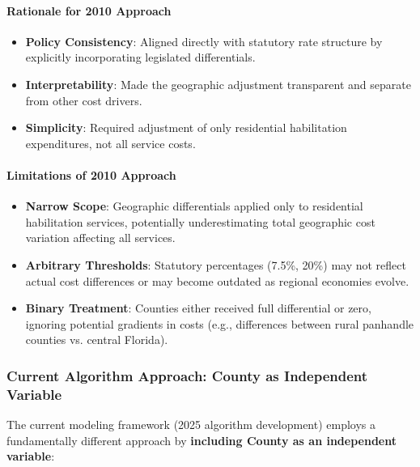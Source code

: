\paragraph{Rationale for 2010 Approach}
\begin{itemize}
    \item \textbf{Policy Consistency}: Aligned directly with statutory rate structure by explicitly incorporating legislated differentials.
    
    \item \textbf{Interpretability}: Made the geographic adjustment transparent and separate from other cost drivers.
    
    \item \textbf{Simplicity}: Required adjustment of only residential habilitation expenditures, not all service costs.
\end{itemize}

\paragraph{Limitations of 2010 Approach}
\begin{itemize}
    \item \textbf{Narrow Scope}: Geographic differentials applied only to residential habilitation services, potentially underestimating total geographic cost variation affecting all services.
    
    \item \textbf{Arbitrary Thresholds}: Statutory percentages (7.5\%, 20\%) may not reflect actual cost differences or may become outdated as regional economies evolve.
    
    \item \textbf{Binary Treatment}: Counties either received full differential or zero, ignoring potential gradients in costs (e.g., differences between rural panhandle counties vs. central Florida).
\end{itemize}

\subsubsection{Current Algorithm Approach: County as Independent Variable}

The current modeling framework (2025 algorithm development) employs a fundamentally different approach by \textbf{including County as an independent variable}:

